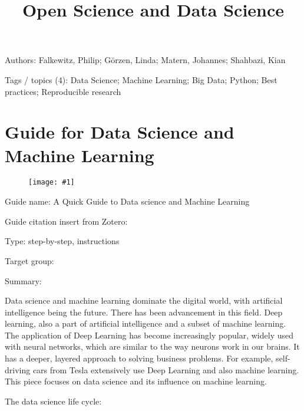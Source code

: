 \documentclass{article}
\newlength{\imgwidth}
\newcommand\scaledgraphics[2]{%
                
\settowidth{\imgwidth}{\texttt{[image: \#1]}}%
                
\setlength{\imgwidth}{\minof{\imgwidth}{#2\textwidth}}%
                
\texttt{[image: \#1]}%
                
}
\begin{document}
\title{Open Science and Data Science}

\maketitle


Authors: Falkewitz, Philip;  Görzen, Linda; Matern, Johannes;  Shahbazi, Kian 


Tags / topics (4): Data Science; Machine Learning; Big Data; Python; Best practices; Reproducible research





\section{Guide for Data Science and Machine Learning}\label{H2305886}






\begin{center}
\begin{figure}
\scaledgraphics{a6637b1c-427c-4ae5-a756-e31455d2fc96.png}{0.5}
\label{F25480991}
\end{figure}


\end{center}


 


Guide name: A Quick Guide to Data science and Machine Learning


Guide citation insert from Zotero: \autocite{qureshi_quick_2020}


Type: step-by-step, instructions


Target group:


Summary: 


Data science and machine learning dominate the digital world, with artificial intelligence being the future. There has been advancement in this field. Deep learning, also a part of artificial intelligence and a subset of machine learning. The application of Deep Learning has become increasingly popular, widely used with neural networks, which are similar to the way neurons work in our brains. It has a deeper, layered approach to solving business problems. For example, self-driving cars from Tesla extensively use Deep Learning and also machine learning. This piece focuses on data science and its influence on machine learning.


The data science life cycle:
\end{document}
